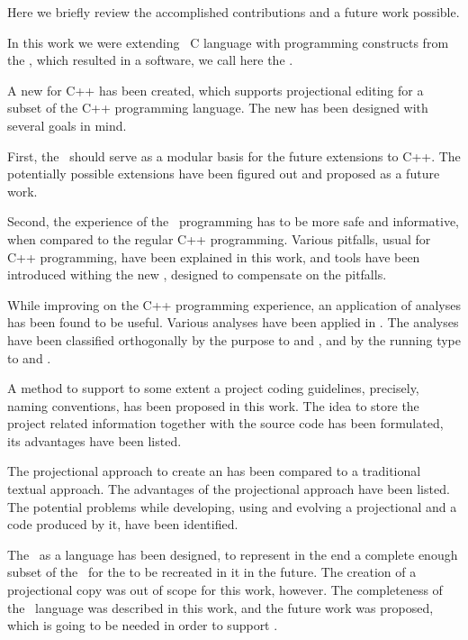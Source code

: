 
Here we briefly review the accomplished contributions and a future work possible.


In this work we were extending \mbdr\ C language with programming constructs from the \cpppl, which 
resulted in a software, we call here the \pcpp. 

A new  for C++ has been created, which supports projectional editing for 
a subset of the C++ programming language. The new  has been designed with several goals 
in mind.

First, the \pcpp\ should serve as a modular basis for the future extensions to C++. The 
potentially possible extensions have been figured out and proposed as a future 
work.

Second, the experience of the \pcpp\ programming has to be more safe and informative,
when compared to the regular C++ programming. Various pitfalls, usual for C++ programming,
have been explained in this work, and tools have been introduced withing the new ,
designed to compensate on the pitfalls.

While improving on the C++ programming experience, an application of analyses has been
found to be useful. Various analyses have been applied in \pcpp. The analyses have been
classified orthogonally by the purpose to  and ,
and by the running type to  and .


A method to support to some extent a project coding guidelines, precisely, naming conventions,
has been proposed in this work. The idea to store the project related information together 
with the source code has been formulated, its advantages have been listed.

The projectional approach to create an  has been compared to a traditional textual approach.
The advantages of the projectional approach have been listed. The potential problems while developing,
using and evolving a projectional  and a code produced by it, have been identified.

The \pcpp\ as a language has been designed, to represent in the end a complete enough subset 
of the \cpppl\ for the  to be recreated in it in the future. The creation of a 
projectional  copy was out of scope for this work, however.
The completeness of the \pcpp\ language was described in this work, and
the future work was proposed, which is going to be needed in order to support .


